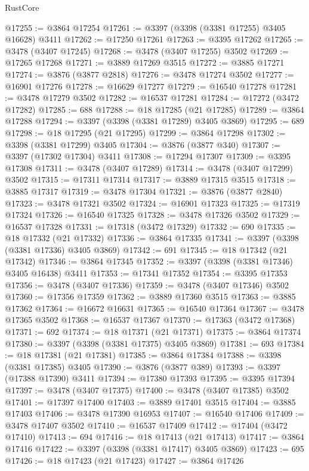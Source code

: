 \begin{lexlean}{RustCore}
\begin{coremodule}
@17255 := @3864 @17254
@17261 := @3397 (@3398 (@3381 @17255) @3405 @16628) @3411
@17262 := @17250 @17261
@17263 := @3395 @17262
@17265 := @3478 (@3407 @17245)
@17268 := @3478 (@3407 @17255) @3502
@17269 := @17265 @17268
@17271 := @3889 @17269 @3515
@17272 := @3885 @17271
@17274 := @3876 (@3877 @2818)
@17276 := @3478 @17274 @3502
@17277 := @16901 @17276
@17278 := @16629 @17277
@17279 := @16540 @17278
@17281 := @3478 @17279 @3502
@17282 := @16537 @17281
@17284 := @17272 (@3472 @17282)
@17285 := 688
@17288 := @18 @17285 (@21 @17285)
@17289 := @3864 @17288
@17294 := @3397 (@3398 (@3381 @17289) @3405 @3869)
@17295 := 689
@17298 := @18 @17295 (@21 @17295)
@17299 := @3864 @17298
@17302 := @3398 (@3381 @17299) @3405
@17304 := @3876 (@3877 @340)
@17307 := @3397 (@17302 @17304) @3411
@17308 := @17294 @17307
@17309 := @3395 @17308
@17311 := @3478 (@3407 @17289)
@17314 := @3478 (@3407 @17299) @3502
@17315 := @17311 @17314
@17317 := @3889 @17315 @3515
@17318 := @3885 @17317
@17319 := @3478 @17304
@17321 := @3876 (@3877 @2840)
@17323 := @3478 @17321 @3502
@17324 := @16901 @17323
@17325 := @17319 @17324
@17326 := @16540 @17325
@17328 := @3478 @17326 @3502
@17329 := @16537 @17328
@17331 := @17318 (@3472 @17329)
@17332 := 690
@17335 := @18 @17332 (@21 @17332)
@17336 := @3864 @17335
@17341 := @3397 (@3398 (@3381 @17336) @3405 @3869)
@17342 := 691
@17345 := @18 @17342 (@21 @17342)
@17346 := @3864 @17345
@17352 := @3397 (@3398 (@3381 @17346) @3405 @16438) @3411
@17353 := @17341 @17352
@17354 := @3395 @17353
@17356 := @3478 (@3407 @17336)
@17359 := @3478 (@3407 @17346) @3502
@17360 := @17356 @17359
@17362 := @3889 @17360 @3515
@17363 := @3885 @17362
@17364 := @16672 @16631
@17365 := @16540 @17364
@17367 := @3478 @17365 @3502
@17368 := @16537 @17367
@17370 := @17363 (@3472 @17368)
@17371 := 692
@17374 := @18 @17371 (@21 @17371)
@17375 := @3864 @17374
@17380 := @3397 (@3398 (@3381 @17375) @3405 @3869)
@17381 := 693
@17384 := @18 @17381 (@21 @17381)
@17385 := @3864 @17384
@17388 := @3398 (@3381 @17385) @3405
@17390 := @3876 (@3877 @389)
@17393 := @3397 (@17388 @17390) @3411
@17394 := @17380 @17393
@17395 := @3395 @17394
@17397 := @3478 (@3407 @17375)
@17400 := @3478 (@3407 @17385) @3502
@17401 := @17397 @17400
@17403 := @3889 @17401 @3515
@17404 := @3885 @17403
@17406 := @3478 @17390 @16953
@17407 := @16540 @17406
@17409 := @3478 @17407 @3502
@17410 := @16537 @17409
@17412 := @17404 (@3472 @17410)
@17413 := 694
@17416 := @18 @17413 (@21 @17413)
@17417 := @3864 @17416
@17422 := @3397 (@3398 (@3381 @17417) @3405 @3869)
@17423 := 695
@17426 := @18 @17423 (@21 @17423)
@17427 := @3864 @17426

\end{coremodule}
\end{lexlean}
